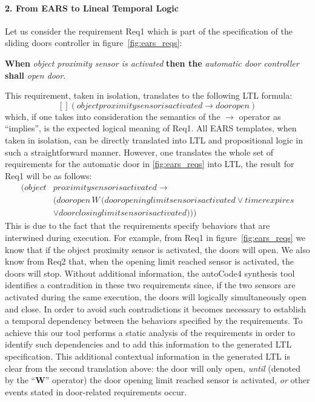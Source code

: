 \paragraph{\textbf{2. From EARS to Lineal Temporal Logic}\\}
\label{sec:ears_LTL} 
\hspace{-.2cm}
Let us consider the requirement \textsf{Req1} which is part of the
specification of the sliding doors controller in figure~\ref{fig:ears_reqs}:
\begin{center}
\textbf{When} \emph{object proximity sensor is activated} \textbf{then the} \emph{automatic door controller} \textbf{shall}
\emph{open door}.
\end{center}
This requirement, taken in isolation, translates to the following LTL
 formula:
$$[] (objectproximitysensorisactivated \rightarrow dooropen)$$
which, if one takes into consideration the semantics of the $\rightarrow$
operator as ``implies'', is the expected logical meaning of \textsf{Req1}. All
EARS templates, when taken in isolation, can be directly translated into LTL and
propositional logic in such a straightforward manner. However, one translates
the whole set of requirements for the automatic door in \ref{fig:ears_reqs} into
LTL, the result for \textsf{Req1} will be as follows:
\begin{align*}
[] (object&proximitysensorisactivated \rightarrow\\
 &(dooropen\,W\,(dooropeninglimitsensorisactivated \lor timerexpires\\
 & \lor doorclosinglimitsensorisactivated )))
\end{align*}
This is due to the fact that the requirements specify behaviors that are
interwined during execution. For example, from \textsf{Req1}  in
figure~\ref{fig:ears_reqs} we know that if the \textsf{object proximity sensor}
is activated, the doors will open. We also know from \textsf{Req2} that, when
the \textsf{opening limit reached} sensor is activated, the doors will stop.
Without additional information, the \textsf{autoCode4} synthesis tool identifies
a contradition in these two requirements since, if the two sensors are activated
during the same execution, the doors will logically simultaneously open and
close. In order to avoid such contradictions it becomes necessary to establish a
temporal dependency between the behaviors specified by the requirements. To
achieve this our tool performs a static analysis of the requirements in order to
identify such dependencies and to add this information to the generated LTL
specification. This additional contextual information in the generated LTL is
clear from the second translation above:
the door will only open, \emph{until} (denoted by the ``\textbf{W}'' operator)
the door \textsf{opening limit reached} sensor is activated, \emph{or} other events
stated in door-related requirements occur.\vspace{-.2cm}
